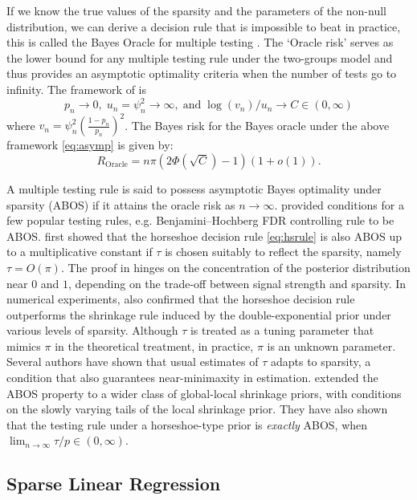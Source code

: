 \documentclass[sts,preprint]{imsart}
\begin{document}
If we know the true values of the sparsity and the parameters of the non-null distribution, we can derive a decision rule that is impossible to beat in
practice, this is called the Bayes Oracle for multiple testing \citep{bogdan2011asymptotic}. The `Oracle risk' serves as the lower bound
for any multiple testing rule under the two-groups model and thus provides an asymptotic optimality criteria when the number of tests go to infinity. The
framework of \citet{bogdan2011asymptotic} is 
\begin{equation}
p_n \to 0, \; u_n = \psi_n^2 \to \infty, \; \text{and} \; \log(v_n)/u_n \to C \in (0,\infty) \label{eq:asymp}
\end{equation}
where $v_n = \psi_n^2 (\frac{1-p_n}{p_n})^2$. The Bayes risk for the Bayes oracle under the above framework \eqref{eq:asymp} is given by:
\[
R_{\text{Oracle}} = n \pi (2 \Phi(\sqrt{C}) - 1)(1+o(1)).
\]

A multiple testing rule is said to possess asymptotic Bayes optimality under sparsity (ABOS) if it attains the oracle risk as $n \to \infty$. \citet{bogdan2011asymptotic} provided conditions for a few popular testing rules, e.g. Benjamini--Hochberg FDR controlling rule to be ABOS. \citet{datta2013asymptotic} first showed that the horseshoe decision rule \eqref{eq:hsrule} is also ABOS up to a multiplicative constant if $\tau$ is
chosen suitably to reflect the sparsity, namely $\tau = O(\pi)$. The proof in \citet{datta2013asymptotic} hinges on the concentration of the posterior distribution near $0$ and $1$, depending on the trade-off between signal strength and sparsity.  In numerical experiments, \citet{datta2013asymptotic} also confirmed that the horseshoe decision rule outperforms the shrinkage rule induced by the double-exponential prior under various levels of sparsity. 
Although $\tau$ is treated as a tuning parameter that mimics $\pi$ in the theoretical treatment, in practice, $\pi$ is an unknown parameter. Several authors \cite{datta2013asymptotic, ghosh2016asymptotic,
ghosh2016testing,van2016many} have shown that usual estimates of $\tau$ adapts to sparsity, a condition that also guarantees near-minimaxity in estimation. \citet{ghosh2016testing} extended the ABOS property to a wider class of global-local shrinkage priors, with conditions on the slowly varying tails of the local shrinkage prior. They have also shown that the testing rule under a horseshoe-type prior is \textit{exactly} ABOS, when $\lim_{n \to \infty} \tau/p \in (0, \infty)$. 

\subsection{Sparse Linear Regression}\label{sec:sparse-linreg}
\end{document}
